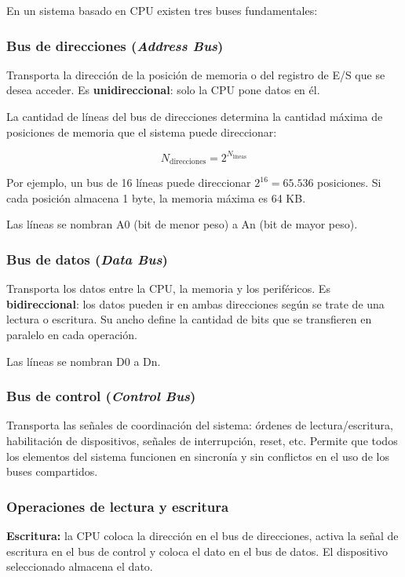 En un sistema basado en CPU existen tres buses fundamentales:

\subsubsection{Bus de direcciones (\textit{Address Bus})}

Transporta la dirección de la posición de memoria o del registro de E/S que se desea acceder. Es \textbf{unidireccional}: solo la CPU pone datos en él.

La cantidad de líneas del bus de direcciones determina la cantidad máxima de posiciones de memoria que el sistema puede direccionar:

$$N_{\text{direcciones}} = 2^{N_{\text{líneas}}}$$

Por ejemplo, un bus de 16 líneas puede direccionar $2^{16} = 65.536$ posiciones. Si cada posición almacena 1 byte, la memoria máxima es 64 KB.

Las líneas se nombran A0 (bit de menor peso) a An (bit de mayor peso).

\subsubsection{Bus de datos (\textit{Data Bus})}

Transporta los datos entre la CPU, la memoria y los periféricos. Es \textbf{bidireccional}: los datos pueden ir en ambas direcciones según se trate de una lectura o escritura. Su ancho define la cantidad de bits que se transfieren en paralelo en cada operación.

Las líneas se nombran D0 a Dn.

\subsubsection{Bus de control (\textit{Control Bus})}

Transporta las señales de coordinación del sistema: órdenes de lectura/escritura, habilitación de dispositivos, señales de interrupción, reset, etc. Permite que todos los elementos del sistema funcionen en sincronía y sin conflictos en el uso de los buses compartidos.

\subsubsection{Operaciones de lectura y escritura}

\textbf{Escritura:} la CPU coloca la dirección en el bus de direcciones, activa la señal de escritura en el bus de control y coloca el dato en el bus de datos. El dispositivo seleccionado almacena el dato.

